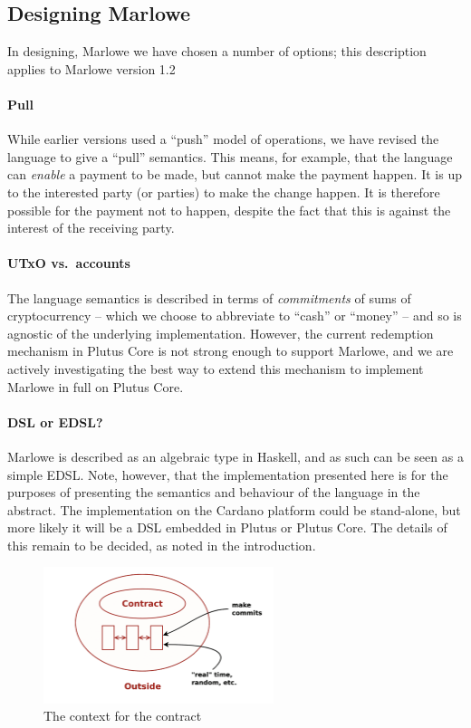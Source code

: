 \documentclass[runningheads]{llncs}
\begin{document}
\subsection{Designing Marlowe}

In designing, Marlowe we have chosen a number of options; this description applies to Marlowe version 1.2 

\paragraph{Pull} 

While earlier versions used a ``push'' model of operations, we have revised the language to give a ``pull'' semantics. 
This means, for example, that the language can \emph{enable} a payment to be made, but cannot make the payment happen. 
It is up to the interested party (or parties) to make the change happen. It is therefore possible for the payment not to 
happen, despite the fact that this is against the interest of the receiving party.


\paragraph{UTxO vs.\ accounts}

The language semantics is described in terms of \emph{commitments} of sums of cryptocurrency -- which we choose to 
abbreviate to ``cash'' or ``money'' -- and so is agnostic of the underlying implementation.  However, the current 
redemption mechanism in Plutus Core is not strong enough to support Marlowe, and we are actively investigating the best 
way to extend this mechanism to implement Marlowe in full on Plutus Core.

\paragraph{DSL or EDSL?}

Marlowe is described as an algebraic  type in Haskell, and as such can be seen as a simple EDSL. 
Note, however, that the implementation presented here is for the purposes of presenting the semantics and behaviour of 
the language in the abstract. The implementation on the Cardano platform could be stand-alone, but more likely it will 
be a DSL embedded in Plutus or Plutus Core. The details of this remain to be decided, as noted in the introduction.

\begin{figure}[t]
\begin{center}
\includegraphics[width=0.6\textwidth]{pix/context.png}
\caption{The context for the contract}
\label{fig:context}
\end{center}
\end{figure}
\end{document}

